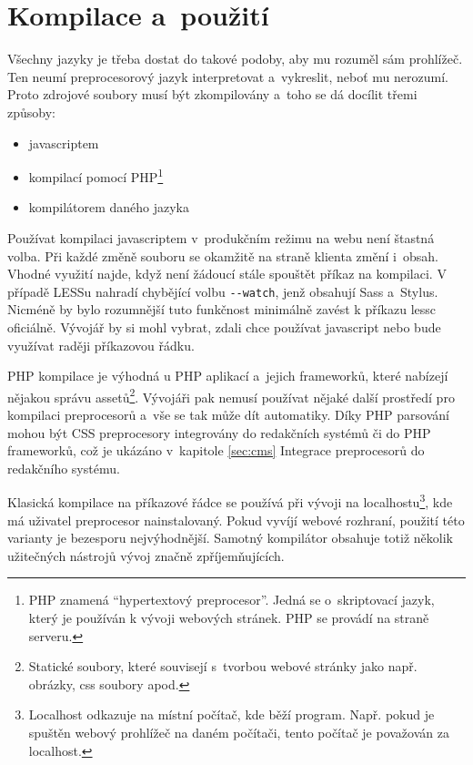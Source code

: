 \documentclass[thesis=B,czech]{FITthesis}[2012/06/26]
\begin{document}
\section{Kompilace a~použití}
\label{sec:comp}


Všechny jazyky je třeba dostat do takové podoby, aby mu rozuměl sám prohlížeč. Ten neumí  preprocesorový jazyk interpretovat a~vykreslit, neboť mu nerozumí. Proto zdrojové soubory musí být zkompilovány a~toho se dá docílit třemi způsoby:


\begin{itemize}
 \item javascriptem
 \item kompilací pomocí PHP\footnote{PHP znamená “hypertextový preprocesor”. Jedná se o~skriptovací jazyk, který je používán k vývoji webových stránek. PHP se provádí na straně serveru.}
 \item kompilátorem daného jazyka
\end{itemize}

Používat kompilaci javascriptem v~produkčním režimu na webu není štastná volba. Při každé změně souboru se okamžitě na straně klienta změní i~obsah. Vhodné využití najde, když není žádoucí stále spouštět příkaz na kompilaci. V případě LESSu nahradí chybějící volbu \verb#--watch#, jenž obsahují Sass a~Stylus. Nicméně by bylo rozumnější tuto funkčnost minimálně zavést k příkazu lessc oficiálně. Vývojář by si mohl vybrat, zdali chce používat javascript nebo bude využívat raději příkazovou řádku. 

PHP kompilace je výhodná u PHP aplikací a~jejich frameworků, které nabízejí nějakou správu assetů\footnote{Statické soubory, které souvisejí s~tvorbou webové stránky jako např. obrázky, css soubory apod.}. Vývojáři pak nemusí používat nějaké další prostředí pro kompilaci preprocesorů a~vše se tak může dít automatiky. Díky PHP parsování mohou být CSS preprocesory integrovány do redakčních systémů či do PHP frameworků, což je ukázáno v~kapitole \ref{sec:cms} Integrace preprocesorů do redakčního systému. 


Klasická kompilace na příkazové řádce se používá při vývoji na localhostu\footnote{Localhost odkazuje na místní počítač, kde běží program. Např. pokud je spuštěn webový prohlížeč na daném počítači, tento počítač je považován za localhost.}, kde má uživatel preprocesor nainstalovaný. Pokud vyvíjí webové rozhraní, použití této varianty je bezesporu nejvýhodnější. Samotný kompilátor obsahuje totiž několik užitečných nástrojů vývoj značně zpříjemňujících. 
\end{document}

